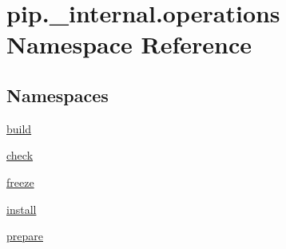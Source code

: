 \hypertarget{namespacepip_1_1__internal_1_1operations}{}\section{pip.\+\_\+internal.\+operations Namespace Reference}
\label{namespacepip_1_1__internal_1_1operations}
\subsection*{Namespaces}
\begin{DoxyCompactItemize}
\item 
 \hyperlink{namespacepip_1_1__internal_1_1operations_1_1build}{build}
\item 
 \hyperlink{namespacepip_1_1__internal_1_1operations_1_1check}{check}
\item 
 \hyperlink{namespacepip_1_1__internal_1_1operations_1_1freeze}{freeze}
\item 
 \hyperlink{namespacepip_1_1__internal_1_1operations_1_1install}{install}
\item 
 \hyperlink{namespacepip_1_1__internal_1_1operations_1_1prepare}{prepare}
\end{DoxyCompactItemize}
